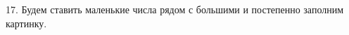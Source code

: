 17. Будем ставить маленькие числа рядом с большими и постепенно заполним картинку.
\begin{center}
\begin{figure}[h!]
\end{figure}
\end{center}
